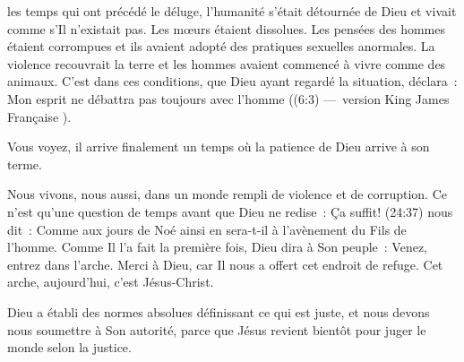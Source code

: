 


 les temps qui ont précédé le déluge, l'humanité s'était
 détournée de Dieu et vivait comme s'Il n'existait pas. Les mœurs étaient
 dissolues. Les pensées des hommes étaient corrompues et ils avaient adopté
 des pratiques sexuelles anormales. La violence recouvrait la terre et les
 hommes avaient commencé à vivre comme des animaux. C'est dans ces conditions,
 que Dieu ayant regardé la situation, déclara~: \og Mon esprit ne débattra pas
 toujours avec l’homme \fg{} ((6:3) ---~version
 \og King James Française \fg{}). 

Vous voyez, il arrive finalement un temps où la patience de Dieu arrive à son terme. 

Nous vivons, nous aussi, dans un monde rempli de violence et de corruption.
 Ce n'est qu'une question de temps avant que Dieu ne redise~: \og Ça suffit! \fg{} 
 (24:37) nous dit~: \og Comme aux jours de Noé ainsi en sera-t-il
 à l'avènement du Fils de l'homme.\fg{} Comme Il l'a fait la première fois, Dieu
 dira à Son peuple~: \og Venez, entrez dans l'arche. \fg{} Merci à Dieu, car Il
 nous a offert cet endroit de refuge. Cet arche, aujourd'hui, c'est Jésus-Christ.



Dieu a établi des normes absolues définissant ce qui est juste, et nous devons
 nous soumettre à Son autorité, parce que Jésus revient bientôt pour juger le
 monde selon la justice.

\dvrule





